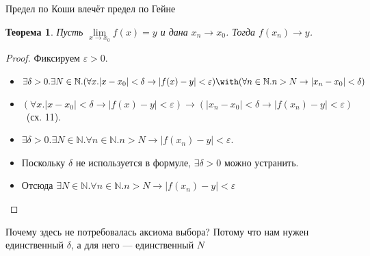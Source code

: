 \documentclass[aspectratio=169]{beamer}
\newtheorem{thm}{Теорема}[section]
\begin{document}
\begin{frame}{Предел по Коши влечёт предел по Гейне}
\begin{thm}Пусть $\lim\limits_{x \rightarrow x_0} f(x) = y$ и дана $x_n \rightarrow x_0$.
Тогда $f(x_n) \rightarrow y$.\end{thm}

\begin{proof}
Фиксируем $\varepsilon > 0$.
\begin{itemize}
\item $\exists \delta > 0.\exists N\in\mathbb{N}.(\forall x.|x - x_0| < \delta \rightarrow |f(x) - y| < \varepsilon) \with
(\forall n\in\mathbb{N}.n > N \rightarrow |x_n - x_0|<\delta)$
\item $(\forall x.|x - x_0| < \delta \rightarrow |f(x) - y| < \varepsilon) \rightarrow (|x_n - x_0| < \delta \rightarrow |f(x_n) - y| < \varepsilon)$ \ (сх. 11).
\item $\exists \delta > 0.\exists N\in\mathbb{N}.\forall n\in\mathbb{N}.n > N\rightarrow |f(x_n) - y| < \varepsilon$.
\item Поскольку $\delta$ не используется в формуле, $\exists \delta > 0$ можно устранить.
\item Отсюда $\exists N\in\mathbb{N}.\forall n\in\mathbb{N}.n > N\rightarrow |f(x_n) - y| < \varepsilon$
\end{itemize}
\end{proof}\pause

Почему здесь не потребовалась аксиома выбора? Потому что нам нужен единственный $\delta$, а для него --- 
единственный $N$

\end{frame}
\end{document}
